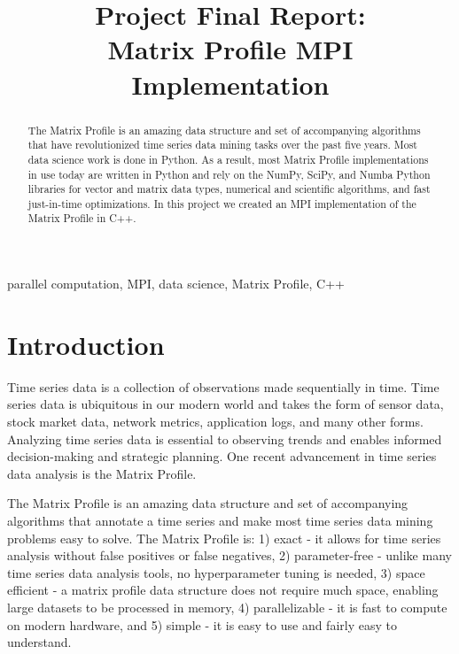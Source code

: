 \documentclass[conference]{IEEEtran}
\begin{document}
\title{Project Final Report:\\Matrix Profile MPI Implementation}

\author{
}


\maketitle
\begin{abstract}
The Matrix Profile is an amazing data structure and set of accompanying algorithms that have revolutionized time series data mining tasks over the past five years.  Most data science work is done in Python.  As a result, most Matrix Profile implementations in use today are written in Python and rely on the NumPy, SciPy, and Numba Python libraries for vector and matrix data types, numerical and scientific algorithms, and fast just-in-time optimizations.  In this project we created an MPI implementation of the Matrix Profile in C++.
\end{abstract}

\begin{IEEEkeywords}
parallel computation, MPI, data science, Matrix Profile, C++
\end{IEEEkeywords}


\section{Introduction}
Time series data is a collection of observations made sequentially in time.  Time series data is ubiquitous in our modern world and takes the form of sensor data, stock market data, network metrics, application logs, and many other forms.  Analyzing time series data is essential to observing trends and enables informed decision-making and strategic planning.  One recent advancement in time series data analysis is the Matrix Profile\cite{MatrixProfile1}. 

The Matrix Profile is an amazing data structure and set of accompanying algorithms that annotate a time series and make most time series data mining problems easy to solve\cite{MatrixProfile2}. The Matrix Profile is:  1) exact - it allows for time series analysis without false positives or false negatives, 2) parameter-free - unlike many time series data analysis tools, no hyperparameter tuning is needed, 3) space efficient - a matrix profile data structure does not require much space, enabling large datasets to be processed in memory, 4) parallelizable - it is fast to compute on modern hardware, and 5) simple - it is easy to use and fairly easy to understand\cite{Keogh}.   
\end{document}

